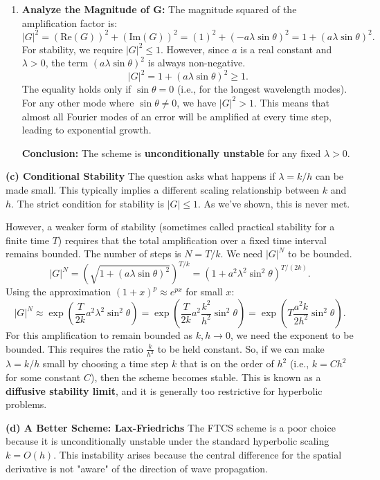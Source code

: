 \begin{solution}
\begin{enumerate}
    \item \textbf{Analyze the Magnitude of G:}
    The magnitude squared of the amplification factor is:
    \[ |G|^2 = (\text{Re}(G))^2 + (\text{Im}(G))^2 = (1)^2 + (-a\lambda\sin\theta)^2 = 1 + (a\lambda\sin\theta)^2. \]
    For stability, we require $|G|^2 \le 1$. However, since $a$ is a real constant and $\lambda > 0$, the term $(a\lambda\sin\theta)^2$ is always non-negative.
    \[ |G|^2 = 1 + (a\lambda\sin\theta)^2 \ge 1. \]
    The equality holds only if $\sin\theta=0$ (i.e., for the longest wavelength modes). For any other mode where $\sin\theta \neq 0$, we have $|G|^2 > 1$. This means that almost all Fourier modes of an error will be amplified at every time step, leading to exponential growth.
    
    \textbf{Conclusion:} The scheme is \textbf{unconditionally unstable} for any fixed $\lambda > 0$.

\end{enumerate}

\textbf{(c) Conditional Stability}
The question asks what happens if $\lambda=k/h$ can be made small. This typically implies a different scaling relationship between $k$ and $h$. The strict condition for stability is $|G| \leq 1$. As we've shown, this is never met.

However, a weaker form of stability (sometimes called practical stability for a finite time $T$) requires that the total amplification over a fixed time interval remains bounded. The number of steps is $N = T/k$. We need $|G|^N$ to be bounded.
\[ |G|^N = \left(\sqrt{1 + (a\lambda\sin\theta)^2}\right)^{T/k} = \left(1 + a^2\lambda^2\sin^2\theta\right)^{T/(2k)}. \]
Using the approximation $(1+x)^p \approx e^{px}$ for small $x$:
\[ |G|^N \approx \exp\left( \frac{T}{2k} a^2 \lambda^2 \sin^2\theta \right) = \exp\left( \frac{T}{2k} a^2 \frac{k^2}{h^2} \sin^2\theta \right) = \exp\left( T \frac{a^2 k}{2h^2} \sin^2\theta \right). \]
For this amplification to remain bounded as $k,h \to 0$, we need the exponent to be bounded. This requires the ratio $\frac{k}{h^2}$ to be held constant.
So, if we can make $\lambda = k/h$ small by choosing a time step $k$ that is on the order of $h^2$ (i.e., $k = C h^2$ for some constant $C$), then the scheme becomes stable. This is known as a \textbf{diffusive stability limit}, and it is generally too restrictive for hyperbolic problems.

\textbf{(d) A Better Scheme: Lax-Friedrichs}
The FTCS scheme is a poor choice because it is unconditionally unstable under the standard hyperbolic scaling $k=O(h)$. This instability arises because the central difference for the spatial derivative is not "aware" of the direction of wave propagation.


\end{solution}

